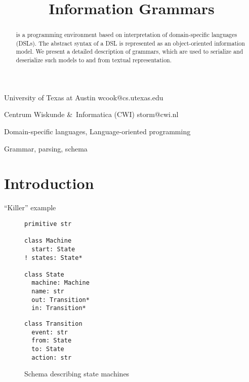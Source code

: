 \documentclass[preprint,10pt]{sigplanconf}
\begin{document}

\title{Information Grammars} %

%
{University of Texas at Austin}%
{wcook@cs.utexas.edu}

%
{Centrum Wiskunde \&\ Informatica (CWI)}%
{storm@cwi.nl}
\maketitle

\begin{abstract}
  \enso is a programming environment based on interpretation of
  domain-specific languages (DSLs). The abstract syntax of a DSL is
  represented as an object-oriented information model. We present a
  detailed description of \enso grammars, which are used to serialize
  and deserialize such models to and from textual representation.
\end{abstract}


\terms
Domain-specific languages, Language-oriented programming

\keywords
Grammar, parsing, schema


\section{Introduction}

``Killer'' example

\begin{figure}
\begin{minipage}[t]{0.5\linewidth}
\begin{lstlisting}[language=ensoschema]
primitive str

class Machine
  start: State
! states: State*

class State
  machine: Machine
  name: str
  out: Transition*
  in: Transition*
\end{lstlisting}
\end{minipage}
\begin{minipage}[t]{0.4\linewidth}
\begin{lstlisting}[language=ensoschema]
class Transition
  event: str
  from: State
  to: State
  action: str
\end{lstlisting}
\end{minipage}
\caption{Schema describing state machines}
\end{figure}
\end{document}
